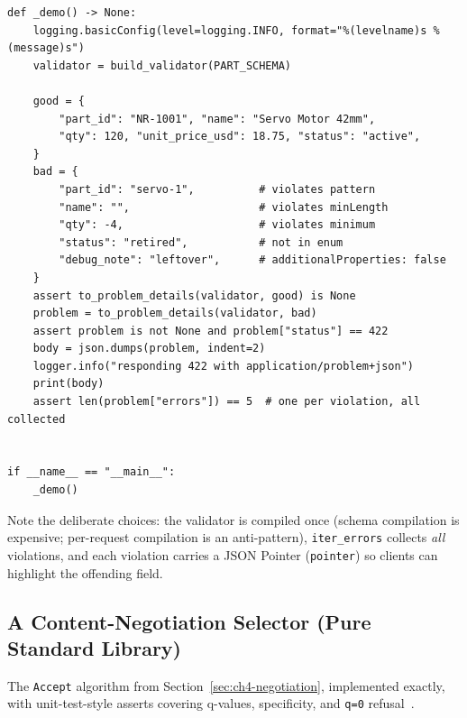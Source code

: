 \begin{verbatim}
def _demo() -> None:
    logging.basicConfig(level=logging.INFO, format="%(levelname)s %(message)s")
    validator = build_validator(PART_SCHEMA)

    good = {
        "part_id": "NR-1001", "name": "Servo Motor 42mm",
        "qty": 120, "unit_price_usd": 18.75, "status": "active",
    }
    bad = {
        "part_id": "servo-1",          # violates pattern
        "name": "",                    # violates minLength
        "qty": -4,                     # violates minimum
        "status": "retired",           # not in enum
        "debug_note": "leftover",      # additionalProperties: false
    }
    assert to_problem_details(validator, good) is None
    problem = to_problem_details(validator, bad)
    assert problem is not None and problem["status"] == 422
    body = json.dumps(problem, indent=2)
    logger.info("responding 422 with application/problem+json")
    print(body)
    assert len(problem["errors"]) == 5  # one per violation, all collected


if __name__ == "__main__":
    _demo()
\end{verbatim}

Note the deliberate choices: the validator is compiled once (schema compilation is
expensive; per-request compilation is an anti-pattern), \texttt{iter\_errors}
collects \emph{all} violations, and each violation carries a JSON Pointer
(\texttt{pointer}) so clients can highlight the offending field.

\subsection{A Content-Negotiation Selector (Pure Standard Library)}
\label{sec:ch4-code-negotiation}

The \texttt{Accept} algorithm from Section~\ref{sec:ch4-negotiation}, implemented
exactly, with unit-test-style asserts covering q-values, specificity, and
\texttt{q=0} refusal~\cite{rfc9110}.

